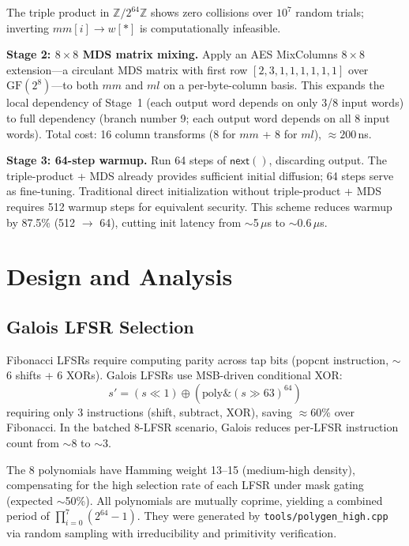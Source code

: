 \documentclass[11pt,a4paper]{article}
\begin{document}
The triple product in $\mathbb{Z}/2^{64}\mathbb{Z}$ shows zero collisions over
$10^7$ random trials; inverting $mm[i] \to w[*]$ is computationally infeasible.

\textbf{Stage 2: $8{\times}8$ MDS matrix mixing.} Apply an AES MixColumns
$8{\times}8$ extension---a circulant MDS matrix with first row
$[2,3,1,1,1,1,1,1]$ over $\mathrm{GF}(2^8)$---to both $mm$ and $ml$ on a
per-byte-column basis. This expands the local dependency of Stage~1 (each output
word depends on only 3/8 input words) to full dependency (branch number 9; each
output word depends on all 8 input words). Total cost: 16 column transforms
(8 for $mm$ + 8 for $ml$), $\approx 200$\,ns.

\textbf{Stage 3: 64-step warmup.} Run 64 steps of $\mathsf{next}()$, discarding
output. The triple-product + MDS already provides sufficient initial diffusion;
64 steps serve as fine-tuning. Traditional direct initialization without
triple-product + MDS requires 512 warmup steps for equivalent security. This
scheme reduces warmup by 87.5\% (512 $\to$ 64), cutting init latency from
$\sim$5\,$\mu$s to $\sim$0.6\,$\mu$s.

\section{Design and Analysis}

\subsection{Galois LFSR Selection}

Fibonacci LFSRs require computing parity across tap bits (popcnt instruction,
$\sim$6 shifts + 6 XORs). Galois LFSRs use MSB-driven conditional XOR:
\begin{equation}
s' = (s \ll 1) \oplus (\mathrm{poly} \mathbin{\&} (s \gg 63)^{64})
\end{equation}
requiring only 3 instructions (shift, subtract, XOR), saving $\approx$60\% over
Fibonacci. In the batched 8-LFSR scenario, Galois reduces per-LFSR instruction
count from $\sim$8 to $\sim$3.

The 8 polynomials have Hamming weight 13--15 (medium-high density), compensating
for the high selection rate of each LFSR under mask gating (expected $\sim$50\%).
All polynomials are mutually coprime, yielding a combined period of
$\prod_{i=0}^{7}(2^{64}-1)$. They were generated by \texttt{tools/polygen\_high.cpp}
via random sampling with irreducibility and primitivity verification.
\end{document}
